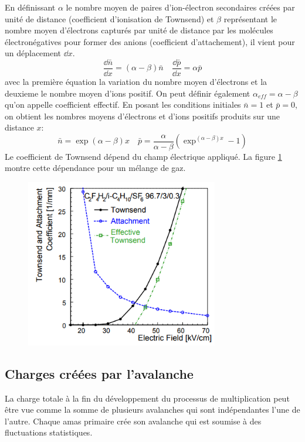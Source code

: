 En définissant $\alpha$ le nombre moyen de paires d'ion-électron secondaires créées par unité de distance (coefficient d'ionisation de Townsend) et  $\beta$ représentant le nombre moyen d'électrons capturés par unité de distance par les molécules électronégatives pour former des anions (coefficient d'attachement), il vient pour un déplacement  $\dd x$.
\begin{equation}
	\frac{\dd \bar{n}}{\dd x}=(\alpha-\beta)\bar{n} \quad  \frac{\dd \bar{p}}{\dd x}=\alpha\bar{p} 
\end{equation}
avec la première équation la variation du nombre moyen d'électrons et la deuxieme le nombre moyen d'ions positif. On peut définir également $\alpha_{eff}=\alpha-\beta$ qu'on appelle coefficient effectif. En posant les conditions initiales $\bar{n}=1$ et $\bar{p}=0$, on obtient les nombres moyens d'électrons et d'ions positifs produits sur une distance $x$: 
\begin{equation}
\bar{n}=\exp(\alpha-\beta)x \quad \bar{p}=\frac{\alpha}{\alpha-\beta}\left(\exp^{(\alpha-\beta)x}-1\right)
\end{equation}
Le coefficient de Townsend dépend du champ électrique appliqué. La figure \ref{tow} montre cette dépendance pour un mélange de gaz.
\begin{figure}[h!]
	\centering
	\includegraphics[width=0.75\textwidth]{RPC/tow.png}
	\label{tow}
\end{figure}


\subsection{Charges créées par l'avalanche}
La charge totale à la fin du développement du processus de multiplication peut être vue comme la somme de plusieurs avalanches qui sont indépendantes l'une de l'autre. Chaque amas primaire crée son avalanche qui est soumise à des fluctuations statistiques.

